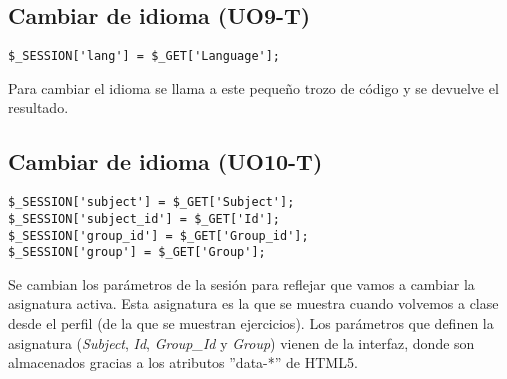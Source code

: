 \subsection{Cambiar de idioma (UO9-T)}
\label{diseno-e-implementacion:logica-negocio:cambiar-idioma}

\noindent
\begin{lstlisting}[caption=Cambiar el idioma de la aplicación.,label={lst:cambiar-idioma}]
$_SESSION['lang'] = $_GET['Language'];
\end{lstlisting}

Para cambiar el idioma se llama a este pequeño trozo de código y se devuelve el resultado.\\

\subsection{Cambiar de idioma (UO10-T)}
\label{diseno-e-implementacion:logica-negocio:cambiar-asignatura}

\noindent
\begin{lstlisting}[caption=Cambiar la asignatura activa.,label={lst:cambiar-asignatura}]
$_SESSION['subject'] = $_GET['Subject'];
$_SESSION['subject_id'] = $_GET['Id'];
$_SESSION['group_id'] = $_GET['Group_id'];
$_SESSION['group'] = $_GET['Group'];
\end{lstlisting}

Se cambian los parámetros de la sesión para reflejar que vamos a cambiar la asignatura activa. Esta asignatura es la que se muestra cuando volvemos a clase desde el perfil (de la que se muestran ejercicios). Los parámetros que definen la asignatura (\textit{Subject}, \textit{Id}, \textit{Group\_Id} y \textit{Group}) vienen de la interfaz, donde son almacenados gracias a los atributos ''data-*'' de HTML5.\\
